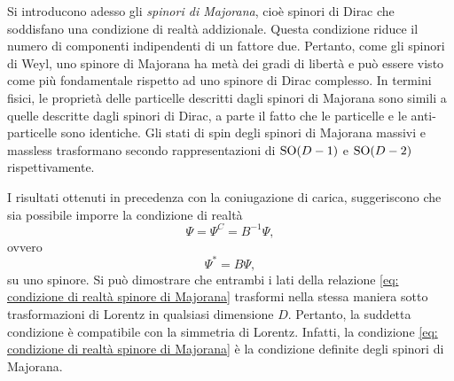 Si introducono adesso gli \emph{spinori di Majorana}, cioè spinori di Dirac che soddisfano una condizione di realtà addizionale. Questa condizione riduce il numero di componenti indipendenti di un fattore due. Pertanto, come gli spinori di Weyl, uno spinore di Majorana ha metà dei gradi di libertà e può essere visto come più fondamentale rispetto ad uno spinore di Dirac complesso. In termini fisici, le proprietà delle particelle descritti dagli spinori di Majorana sono simili a quelle descritte dagli spinori di Dirac, a parte il fatto che le particelle e le anti-particelle sono identiche. Gli stati di spin degli spinori di Majorana massivi e massless trasformano secondo rappresentazioni di $\mathrm{SO}(D - 1)$ e $\mathrm{SO}(D - 2)$ rispettivamente. 

I risultati ottenuti in precedenza con la coniugazione di carica, suggeriscono che sia possibile imporre la condizione di realtà 
\begin{equation}
\label{eq: condizione di realtà spinore di Majorana}
    \Psi = \Psi^C = B^{-1}\Psi,
\end{equation}
ovvero 
\begin{equation}
\label{eq: condizione di realtà spinore di Majorana (II forma)}
    \Psi^* = B\Psi,
\end{equation}
su uno spinore. Si può dimostrare che entrambi i lati della relazione \eqref{eq: condizione di realtà spinore di Majorana} trasformi nella stessa maniera sotto trasformazioni di Lorentz in qualsiasi dimensione $D$. Pertanto, la suddetta condizione è compatibile con la simmetria di Lorentz. Infatti, la condizione \eqref{eq: condizione di realtà spinore di Majorana} è la condizione definite degli spinori di Majorana. 

